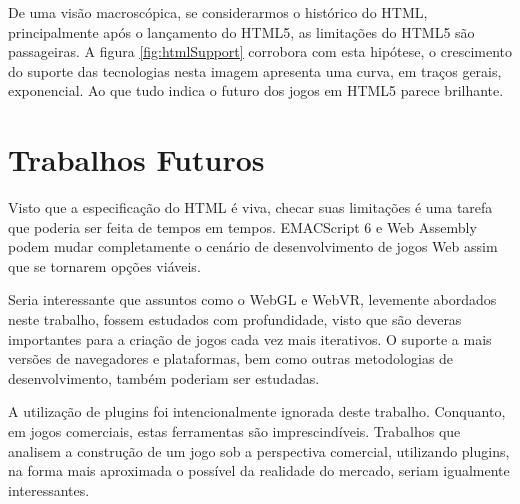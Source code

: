 De uma visão macroscópica, se considerarmos o histórico do HTML,
principalmente após o lançamento do HTML5, as limitações do HTML5
são passageiras. A figura \ref{fig:htmlSupport} corrobora com esta
hipótese, o crescimento do suporte das tecnologias nesta imagem
apresenta uma curva, em traços gerais, exponencial. Ao que tudo indica
o futuro dos jogos em HTML5 parece brilhante.

\section{Trabalhos Futuros}

Visto que a especificação do HTML é viva, checar suas limitações
é uma tarefa que poderia ser feita de tempos em tempos. EMACScript 6
e Web Assembly podem mudar completamente o cenário de desenvolvimento
de jogos Web assim que se tornarem opções viáveis.

Seria interessante que assuntos como o WebGL e WebVR, levemente
abordados neste trabalho, fossem estudados com profundidade, visto que
são deveras importantes para a criação de jogos cada vez mais
iterativos. O suporte a mais versões de navegadores e plataformas,
bem como outras metodologias de desenvolvimento, também poderiam ser
estudadas.

A utilização de plugins foi intencionalmente ignorada deste
trabalho. Conquanto, em jogos comerciais, estas ferramentas são
imprescindíveis. Trabalhos que analisem a construção de um jogo sob
a perspectiva comercial, utilizando plugins, na forma mais aproximada
o possível da realidade do mercado, seriam igualmente interessantes.
